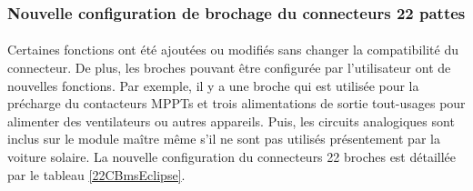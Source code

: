 	
	\subsubsection{Nouvelle configuration de brochage du connecteurs 22 pattes}	
		\paragraph*{}
		Certaines fonctions ont été ajoutées ou modifiés sans changer la compatibilité du connecteur. De plus, les broches pouvant être configurée par l'utilisateur ont de nouvelles fonctions. Par exemple, il y a une broche qui est utilisée pour la précharge du contacteurs MPPTs et trois alimentations de sortie tout-usages pour alimenter des ventilateurs ou autres appareils. Puis, les circuits analogiques sont inclus sur le module maître même s'il ne sont pas utilisés présentement par la voiture solaire. La nouvelle configuration du connecteurs 22 broches est détaillée par le tableau \ref{22CBmsEclipse}.
		
